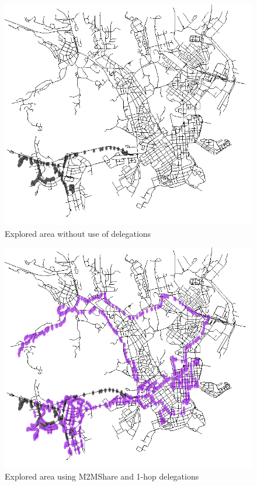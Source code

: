 \begin{figure}[htpb]
  \begin{center}
    \includegraphics[scale=0.35]{figure/mappa_0_hop.png}
    \caption{Explored area without use of delegations}
    \label{mappa0Hop}
  \end{center}
\end{figure}

\begin{figure}[htpb]
  \begin{center}
    \includegraphics[scale=0.35]{figure/mappa_1_hop.png}
    \caption{Explored area using M2MShare and 1-hop delegations}
    \label{mappa1Hop}
  \end{center}
\end{figure}

